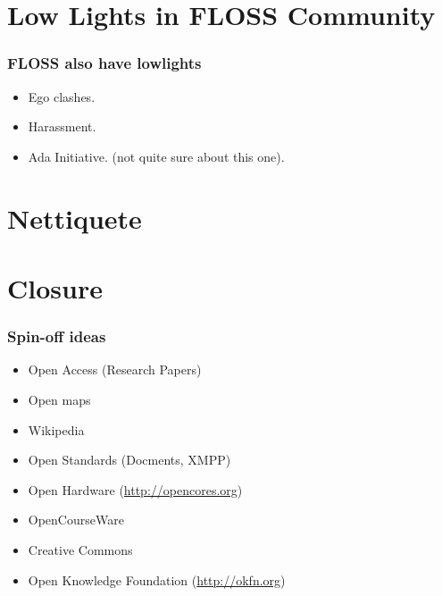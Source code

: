 \documentclass[hyperref={pdfpagelabels=false},xcolor=pst,pdf,fragile]{beamer}
\begin{document}
\section{Low Lights in FLOSS Community}

\begin{frame}
  \frametitle{FLOSS also have lowlights}

  \begin{itemize}
	\item Ego clashes.
	\item Harassment.
	\item Ada Initiative. (not quite sure about this one).
  \end{itemize}

\end{frame}

\section{Nettiquete}

\section{Closure}

\begin{frame}
  \frametitle{Spin-off ideas}

  \begin{itemize}
	  \item Open Access (Research Papers)

	  \item Open maps
		  \pause
	  \item Wikipedia
		  \pause
	  \item Open Standards (Docments, XMPP)
		  \pause
	  \item Open Hardware (\url{http://opencores.org})
		  \pause
	  \item OpenCourseWare
		  \pause
	  \item Creative Commons
		  \pause
	  \item Open Knowledge Foundation (\url{http://okfn.org})
  \end{itemize}

\end{frame}
\end{document}
